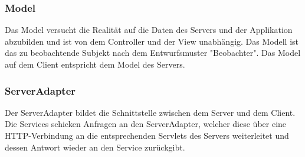 	\subsubsection{Model}
Das Model versucht die Realität auf die Daten des Servers und der Applikation abzubilden und ist von dem Controller und der View unabhängig. Das Modell ist das zu beobachtende Subjekt nach dem Entwurfsmuster "Beobachter".
Das Model auf dem Client entspricht dem Model des Servers.
	\subsubsection{ServerAdapter}
	Der ServerAdapter bildet die Schnittstelle zwischen dem Server und dem Client. Die Services schicken Anfragen an den ServerAdapter, welcher diese über eine HTTP-Verbindung an die entsprechenden Servlets des Servers weiterleitet und dessen Antwort wieder an den Service zurückgibt.


	\newpage
